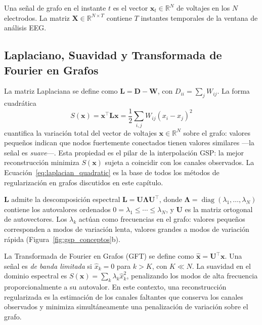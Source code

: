 Una señal de grafo en el instante $t$ es el vector $\mathbf{x}_t \in \mathbb{R}^N$ de voltajes en los $N$ electrodos. La matriz $\mathbf{X} \in \mathbb{R}^{N \times T}$ contiene $T$ instantes temporales de la ventana de análisis EEG.

\subsection{Laplaciano, Suavidad y Transformada de Fourier en Grafos}

La matriz Laplaciana se define como $\mathbf{L} = \mathbf{D} - \mathbf{W}$, con $D_{ii} = \sum_j W_{ij}$. La forma cuadrática
\begin{equation}
S(\mathbf{x}) = \mathbf{x}^\top \mathbf{L} \mathbf{x} = \frac{1}{2} \sum_{i,j} W_{ij} (x_i - x_j)^2
\label{eq:laplacian_quadratic}
\end{equation}
cuantifica la variación total del vector de voltajes $\mathbf{x} \in \mathbb{R}^N$ sobre el grafo: valores pequeños indican que nodos fuertemente conectados tienen valores similares ---la señal es \textit{suave}---. Esta propiedad es el pilar de la interpolación GSP: la mejor reconstrucción minimiza $S(\mathbf{x})$ sujeta a coincidir con los canales observados. La Ecuación~\ref{eq:laplacian_quadratic} es la base de todos los métodos de regularización en grafos discutidos en este capítulo.

$\mathbf{L}$ admite la descomposición espectral $\mathbf{L} = \mathbf{U} \boldsymbol{\Lambda} \mathbf{U}^\top$, donde $\boldsymbol{\Lambda} = \operatorname{diag}(\lambda_1, \dots, \lambda_N)$ contiene los autovalores ordenados $0 = \lambda_1 \leq \cdots \leq \lambda_N$, y $\mathbf{U}$ es la matriz ortogonal de autovectores. Los $\lambda_k$ actúan como frecuencias en el grafo: valores pequeños corresponden a modos de variación lenta, valores grandes a modos de variación rápida (Figura~\ref{fig:gsp_conceptos}b).

La Transformada de Fourier en Grafos (GFT) se define como $\hat{\mathbf{x}} = \mathbf{U}^\top \mathbf{x}$. Una señal es \textit{de banda limitada} si $\hat{x}_k = 0$ para $k > K$, con $K \ll N$. La suavidad en el dominio espectral es $S(\mathbf{x}) = \sum_k \lambda_k \hat{x}_k^2$, penalizando los modos de alta frecuencia proporcionalmente a su autovalor. En este contexto, una reconstrucción regularizada es la estimación de los canales faltantes que conserva los canales observados y minimiza simultáneamente una penalización de variación sobre el grafo.

